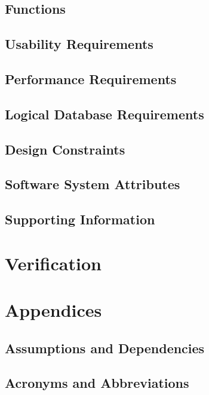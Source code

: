 \subsection{Functions}

\subsection{Usability Requirements}

\subsection{Performance Requirements}

\subsection{Logical Database Requirements}

\subsection{Design Constraints}

\subsection{Software System Attributes}

\subsection{Supporting Information}

\section{Verification}

\section{Appendices}


\subsection{Assumptions and Dependencies}

\subsection{Acronyms and Abbreviations}

